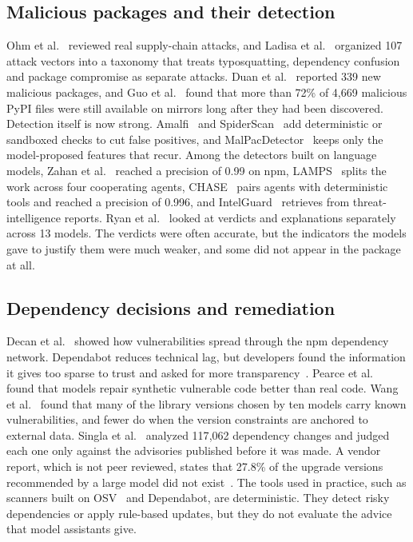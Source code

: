 \documentclass[conference]{IEEEtran}
\begin{document}
\subsection{Malicious packages and their detection}
Ohm et al.~\cite{ohm2020} reviewed real supply-chain attacks, and Ladisa et al.~\cite{ladisa2023} organized 107
attack vectors into a taxonomy that treats typosquatting, dependency confusion and package compromise as separate
attacks. Duan et al.~\cite{duan2021} reported 339 new malicious packages, and Guo et al.~\cite{guo2023} found that
more than 72\% of 4{,}669 malicious PyPI files were still available on mirrors long after they had been discovered.
Detection itself is now strong. Amalfi~\cite{sejfia2022} and SpiderScan~\cite{huang2024} add deterministic or
sandboxed checks to cut false positives, and MalPacDetector~\cite{wang2025mal} keeps only the model-proposed
features that recur. Among the detectors built on language models, Zahan et al.~\cite{zahan2025} reached a
precision of 0.99 on npm, LAMPS~\cite{zeshan2026} splits the work across four cooperating agents,
CHASE~\cite{toda2025} pairs agents with deterministic tools and reached a precision of 0.996, and
IntelGuard~\cite{guo2026} retrieves from threat-intelligence reports. Ryan et al.~\cite{ryan2026} looked at
verdicts and explanations separately across 13 models. The verdicts were often accurate, but the indicators the
models gave to justify them were much weaker, and some did not appear in the package at all.

\subsection{Dependency decisions and remediation}
Decan et al.~\cite{decan2018} showed how vulnerabilities spread through the npm dependency network. Dependabot
reduces technical lag, but developers found the information it gives too sparse to trust and asked for more
transparency~\cite{he2023}. Pearce et al.~\cite{pearce2023} found that models repair synthetic vulnerable code
better than real code. Wang et al.~\cite{wang2026} found that many of the library versions chosen by ten models
carry known vulnerabilities, and fewer do when the version constraints are anchored to external data. Singla
et al.~\cite{singla2026} analyzed 117{,}062 dependency changes and judged each one only against the advisories
published before it was made. A vendor report, which is not peer reviewed, states that 27.8\% of the upgrade
versions recommended by a large model did not exist~\cite{sonatype2026}. The tools used in practice, such as
scanners built on OSV~\cite{osv} and Dependabot, are deterministic. They detect risky dependencies or apply
rule-based updates, but they do not evaluate the advice that model assistants give.
\end{document}
